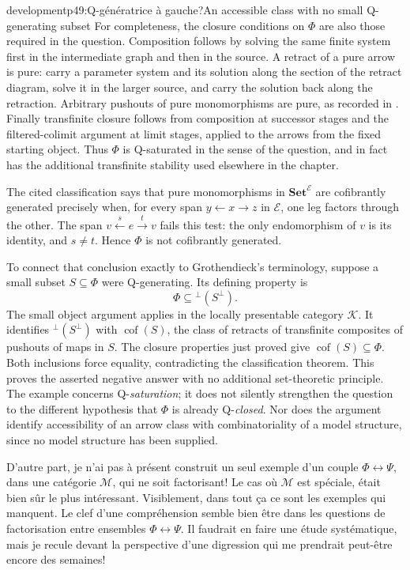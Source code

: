 \begin{dcomment}{development}{p49:Q-génératrice à gauche?}{An accessible class with no small Q-generating subset}
For completeness, the closure conditions on $\Phi$ are also those required in the question. Composition follows by solving the same finite system first in the intermediate graph and then in the source. A retract of a pure arrow is pure: carry a parameter system and its solution along the section of the retract diagram, solve it in the larger source, and carry the solution back along the retraction. Arbitrary pushouts of pure monomorphisms are pure, as recorded in \citet[Fact~2.9(iii)]{CoxEtAl2026Pure}. Finally transfinite closure follows from composition at successor stages and the filtered-colimit argument at limit stages, applied to the arrows from the fixed starting object. Thus $\Phi$ is Q-saturated in the sense of the question, and in fact has the additional transfinite stability used elsewhere in the chapter.

The cited classification says that pure monomorphisms in $\mathbf{Set}^{\mathcal E}$ are cofibrantly generated precisely when, for every span $y\leftarrow x\to z$ in $\mathcal E$, one leg factors through the other. The span $v\xleftarrow{s}e\xrightarrow{t}v$ fails this test: the only endomorphism of $v$ is its identity, and $s\ne t$. Hence $\Phi$ is not cofibrantly generated.

To connect that conclusion exactly to Grothendieck's terminology, suppose a small subset $S\subseteq\Phi$ were Q-generating. Its defining property is
\[
 \Phi\subseteq{}^\perp(S^\perp).
\]
The small object argument applies in the locally presentable category $\mathcal K$. It identifies ${}^\perp(S^\perp)$ with $\operatorname{cof}(S)$, the class of retracts of transfinite composites of pushouts of maps in $S$. The closure properties just proved give $\operatorname{cof}(S)\subseteq\Phi$. Both inclusions force equality, contradicting the classification theorem. This proves the asserted negative answer with no additional set-theoretic principle. The example concerns Q-\emph{saturation}; it does not silently strengthen the question to the different hypothesis that $\Phi$ is already Q-\emph{closed}. Nor does the argument identify accessibility of an arrow class with combinatoriality of a model structure, since no model structure has been supplied.
\end{dcomment}


\marginpar{! \textbar}D'autre part, je n'ai pas à présent construit un seul exemple d'un couple $\Phi \longleftrightarrow \Psi$, dans une catégorie $\mathcal{M}$, qui ne soit factorisant! Le cas où $\mathcal{M}$ est spéciale, était bien sûr le plus intéressant. Visiblement, dans tout
ça ce sont les exemples qui manquent. Le clef d'une compréhension semble bien être dans les questions de factorisation entre ensembles $\Phi \longleftrightarrow \Psi$. Il faudrait en faire une étude systématique, mais je recule devant la perspective d'une digression qui me prendrait peut-être encore des semaines! %


